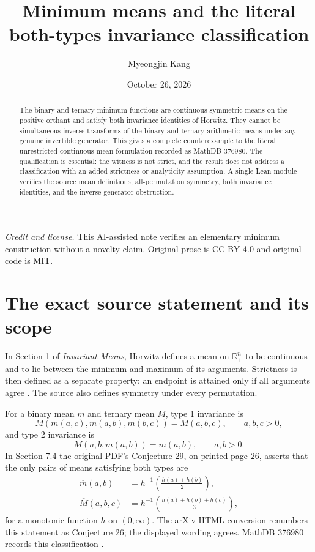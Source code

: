 \documentclass[11pt]{article}
\title{Minimum means and the literal both-types invariance classification}
\author{Myeongjin Kang}
\date{October 26, 2026}
\newcommand{\R}{\mathbb R}
\begin{document}
\maketitle
\begin{abstract}
The binary and ternary minimum functions are continuous symmetric means on the positive orthant and satisfy both invariance identities of Horwitz. They cannot be simultaneous inverse transforms of the binary and ternary arithmetic means under any genuine invertible generator. This gives a complete counterexample to the literal unrestricted continuous-mean formulation recorded as MathDB 376980. The qualification is essential: the witness is not strict, and the result does not address a classification with an added strictness or analyticity assumption. A single Lean module verifies the source mean definitions, all-permutation symmetry, both invariance identities, and the inverse-generator obstruction.
\end{abstract}
\noindent\textit{Credit and license.} This AI-assisted note verifies an elementary minimum construction without a novelty claim. Original prose is CC BY 4.0 and original code is MIT.


\section{The exact source statement and its scope}
In Section 1 of \emph{Invariant Means}, Horwitz defines a mean on $\R_{+}^{n}$ to be continuous and to lie between the minimum and maximum of its arguments. Strictness is then defined as a separate property: an endpoint is attained only if all arguments agree \cite{horwitz}. The source also defines symmetry under every permutation.

For a binary mean $m$ and ternary mean $M$, type 1 invariance is
\begin{equation}\label{eq:type1}
 M(m(a,c),m(a,b),m(b,c))=M(a,b,c),\qquad a,b,c>0,
\end{equation}
and type 2 invariance is
\begin{equation}\label{eq:type2}
 M(a,b,m(a,b))=m(a,b),\qquad a,b>0.
\end{equation}
In Section 7.4 the original PDF's Conjecture 29, on printed page 26, asserts that the only pairs of means satisfying both types are
\begin{align}
 \overline m(a,b)&=h^{-1}\left(\frac{h(a)+h(b)}2\right),\label{eq:binary}\\
 \overline M(a,b,c)&=h^{-1}\left(\frac{h(a)+h(b)+h(c)}3\right),\label{eq:ternary}
\end{align}
for a monotonic function $h$ on $(0,\infty)$. The arXiv HTML conversion renumbers this statement as Conjecture 26; the displayed wording agrees. MathDB 376980 records this classification \cite{mathdb}.
\end{document}
